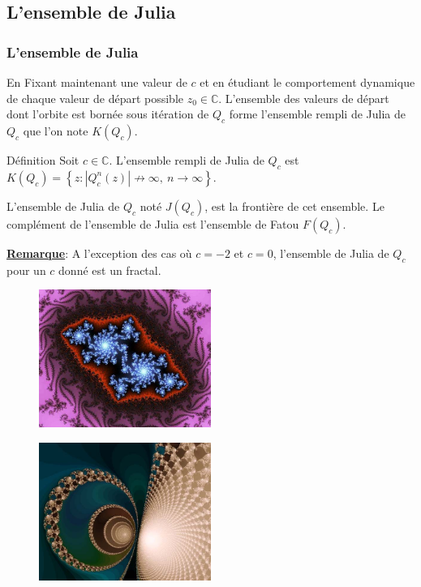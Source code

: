 \documentclass[aspectratio=1610]{beamer}
\begin{document}
\subsection{L'ensemble de Julia}
\begin{frame}
    \frametitle{L'ensemble de Julia}
    En Fixant maintenant une valeur de $c$ et en étudiant le comportement dynamique de chaque valeur de départ possible $z_0\in \mathbb{C}$. L'ensemble des valeurs de départ dont l'orbite est bornée sous itération de $Q_{c}$ forme l'ensemble rempli de Julia de $Q_{c}$ que l'on note $K(Q_{c})$. 
\begin{block}{Définition}
    Soit $c\in \mathbb{C}$. L'ensemble rempli de Julia de $Q_{c}$ est $K(Q_{c})=\left\{ z:|Q^{n}_{c}(z)| \nrightarrow \infty, \ n\to \infty \right\}$. 

     L'ensemble de Julia de $Q_{c}$ noté $J(Q_{c})$, est la frontière de cet ensemble. Le complément de l'ensemble de Julia est l'ensemble de Fatou $F(Q_{c})$.
\end{block}
\textbf{\underline{Remarque}}: A l'exception des cas où $c=-2$ et  $c=0$, l'ensemble de Julia de  $Q_c$ pour un  $c$ donné est un fractal.

\begin{minipage}{0.5\textwidth}
    \begin{figure}[h]
    \centering
    \includegraphics[width=0.5\textwidth]{mand126}
    \label{fig:fractal_5}
\end{figure}
\end{minipage}%
\begin{minipage}{0.5\textwidth}
\begin{figure}[h]
    \centering
    \includegraphics[width=0.5\textwidth]{mand41}
    \label{fig:mand41}
\end{figure}
\end{minipage}
\end{frame}
\end{document}
